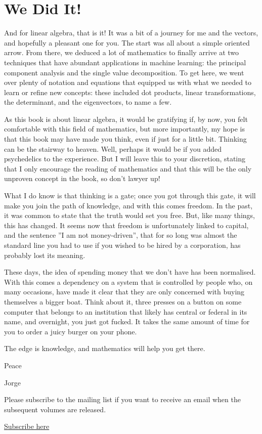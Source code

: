 \documentclass[a4,12pt,twosided,openany]{memoir}
\begin{document}
\section{We Did It!}
And for linear algebra, that is it! It was a bit of a journey for me and the vectors, and hopefully a pleasant one for you. The start was all about a simple oriented arrow. From there, we deduced a lot of mathematics to finally arrive at two techniques that have abundant applications in machine learning: the principal component analysis and the single value decomposition. To get here, we went over plenty of notation and equations that equipped us with what we needed to learn or refine new concepts: these included dot products, linear transformations, the determinant, and the eigenvectors, to name a few.
\par 
\indent
As this book is about linear algebra, it would be gratifying if, by now, you felt comfortable with this field of mathematics, but more importantly, my hope is that this book may have made you think, even if just for a little bit. Thinking can be the stairway to heaven. Well, perhaps it would be if you added psychedelics to the experience. But I will leave this to your discretion, stating that I only encourage the reading of mathematics and that this will be the only unproven concept in the book, so don’t lawyer up! 
\par 
\indent
What I do know is that thinking is a gate; once you got through this gate, it will make you join the path of knowledge, and with this comes freedom. In the past, it was common to state that the truth would set you free. But, like many things, this has changed. It seems now that freedom is unfortunately linked to capital, and the sentence ”I am not money-driven”, that for so long was almost the standard line you had to use if you wished to be hired by a corporation, has probably lost its meaning. 
\par 
\indent
These days, the idea of spending money that we don’t have has been normalised. With this comes a dependency on a system that is controlled by people who, on many occasions, have made it clear that they are only concerned with buying themselves a bigger boat. Think about it, three presses on a button on some computer that belongs to an institution that likely has central or federal in its name, and overnight, you just got fucked. It takes the same amount of time for you to order a juicy burger on your phone. 
\par 
\indent
\vspace{10pt}
The edge is knowledge, and mathematics will help you get there.
\par 
Peace
\vspace{10pt}
\indent
\par 
Jorge
\vspace{10pt}
\par
\indent
Please subscribe to the mailing list if you want to receive an email when the subsequent volumes are released.
\vspace{10pt}
\begin{center}
\href{http://eepurl.com/ijUQcz}{Subscribe here}
\end{center}
\end{document}
